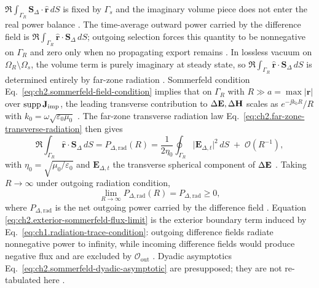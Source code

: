 $\Re\int_{\Gamma_R}\mathbf{S}_\Delta\cdot\hat{\mathbf{r}}\,dS$ is fixed by
$\Gamma_s$ and the imaginary volume piece does not enter the real power balance
\cite{stratton1941,harrington2001}. The time-average outward power carried by the difference
field is $\Re\int_{\Gamma_R}\hat{\mathbf{r}}\cdot\mathbf{S}_\Delta\,dS$; outgoing selection
forces this quantity to be nonnegative on $\Gamma_R$ and zero only when no propagating export
remains \cite{harrington2001,stratton1941}. In lossless vacuum on
\(\Omega_R\setminus\Omega_s\), the volume term is purely imaginary at steady state,
so \(\Re\int_{\Gamma_R}\hat{\mathbf{r}}\cdot\mathbf{S}_\Delta\,dS\) is determined
entirely by far-zone radiation \cite{harrington2001}.
Sommerfeld condition Eq.~\eqref{eq:ch2.sommerfeld-field-condition} implies that on
\(\Gamma_R\) with \(R\gg a=\max|\mathbf{r}|\) over \(\operatorname{supp}\mathbf{J}_{\mathrm{imp}}\), the
leading transverse contribution to \(\Delta\mathbf{E},\Delta\mathbf{H}\) scales as
\(e^{-\jj k_0 R}/R\) with \(k_0=\omega\sqrt{\varepsilon_0\mu_0}\)
\cite{stratton1941}. The far-zone transverse radiation law
Eq.~\eqref{eq:ch2.far-zone-transverse-radiation} then gives
\begin{equation}
\label{eq:ch2.exterior-flux-asymptotic}
\Re\int_{\Gamma_R}\hat{\mathbf{r}}\cdot\mathbf{S}_\Delta\,dS
=
P_{\Delta,\mathrm{rad}}(R)
=
\frac{1}{2\eta_0}\oint_{\Gamma_R}
\big|\mathbf{E}_{\Delta,t}\big|^{2}\,dS
\;+\;\mathcal{O}(R^{-1}),
\end{equation}
with \(\eta_0=\sqrt{\mu_0/\varepsilon_0}\) and \(\mathbf{E}_{\Delta,t}\) the
transverse spherical component of \(\Delta\mathbf{E}\) \cite{stratton1941}. Taking
\(R\to\infty\) under outgoing radiation condition,
\begin{equation}
\label{eq:ch2.exterior-sommerfeld-flux-limit}
\lim_{R\to\infty}P_{\Delta,\mathrm{rad}}(R)
=
P_{\Delta,\mathrm{rad}}\ge 0,
\end{equation}
where \(P_{\Delta,\mathrm{rad}}\) is the net outgoing power carried by the difference
field \cite{stratton1941}. Equation
\eqref{eq:ch2.exterior-sommerfeld-flux-limit} is the exterior boundary term induced
by Eq.~\eqref{eq:ch1.radiation-trace-condition}: outgoing difference fields radiate
nonnegative power to infinity, while incoming difference fields would produce negative
flux and are excluded by \(\mathcal{O}_{\mathrm{out}}\)
\cite{jackson1999}. Dyadic asymptotics
Eq.~\eqref{eq:ch2.sommerfeld-dyadic-asymptotic} are presupposed; they are not
re-tabulated here \cite{harrington2001}.
